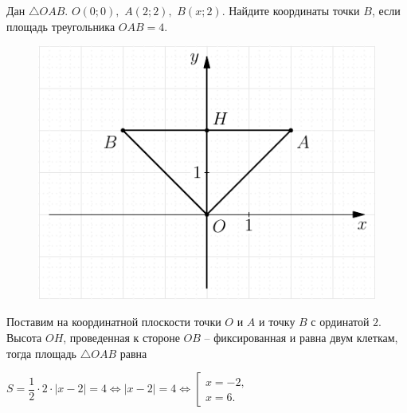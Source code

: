  Дан $\triangle OAB.$ $O(0;0),$ $A(2;2),$ $B(x;2).$ Найдите координаты точки $B$, если площадь треугольника $OAB=4$. \\
\begin{figure}[h]
	\centering
	\includegraphics[scale = 1]{pic19.pdf}
\end{figure}
\Solution
Поставим на координатной плоскости точки $O$ и $A$ и точку $B$ с ординатой $2$.\\
Высота $OH$, проведенная к стороне $OB$ -- фиксированная и равна двум клеткам, тогда площадь $\triangle OAB$ равна
\begin{center}$
S=\dfrac12\cdot2\cdot|x-2|=4 \Leftrightarrow |x-2|=4 \Leftrightarrow \left[ \begin{array}{l} x=-2,\\x=6.
\end{array}\right.$\\
\end{center}

